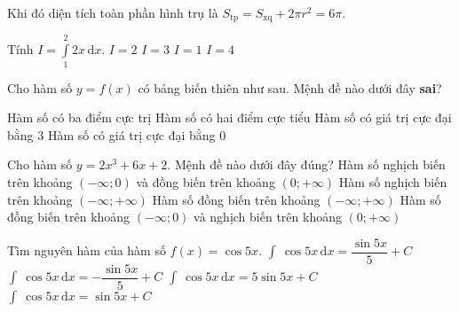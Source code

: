 \begin{ex}
{Khi đó diện tích toàn phần hình trụ là $S_{\text{tp}} = S_{\text{xq}} + 2\pi r^2 = 6\pi$.
}
\end{ex}\begin{ex}%
Tính $I = \displaystyle\int\limits_1^2 2x\mathrm{\,d}x$.
\choice
{$I = 2$}
{\True $I = 3$}
{$I = 1$}
{$I = 4$}
\end{ex}\begin{ex}%
Cho hàm số $y = f\left(x\right)$ có bảng biến thiên như sau. Mệnh đề nào dưới đây \textbf{sai}?
\begin{center}
\end{center}
\choice
{Hàm số có ba điểm cực trị}
{Hàm số có hai điểm cực tiểu}
{Hàm số có giá trị cực đại bằng $3$}
{\True Hàm số có giá trị cực đại bằng $0$}
\end{ex}\begin{ex}%
Cho hàm số $y = 2x^3 + 6x + 2$. Mệnh đề nào dưới đây đúng?
\choice
{Hàm số nghịch biến trên khoảng $\left(-\infty;0\right)$ và đồng biến trên khoảng $\left(0;+\infty\right)$}
{Hàm số nghịch biến trên khoảng $\left(-\infty;+\infty\right)$}
{\True Hàm số đồng biến trên khoảng $\left(-\infty;+\infty\right)$}
{Hàm số đồng biến trên khoảng $\left(-\infty;0\right)$ và nghịch biến trên khoảng $\left(0;+\infty\right)$}
\end{ex}
\begin{ex}%
Tìm nguyên hàm của hàm số $f\left(x\right) = \cos 5x$.
\choice
{\True $\displaystyle\int\ \cos 5x\mathrm{\,d}x = \dfrac{\sin 5x}{5} + C$}
{$\displaystyle\int\ \cos 5x\mathrm{\,d}x = - \dfrac{\sin 5x}{5} + C$}
{$\displaystyle\int\ \cos 5x\mathrm{\,d}x = 5\sin 5x + C$}
{$\displaystyle\int\ \cos 5x\mathrm{\,d}x = \sin 5x + C$}
\end{ex}
